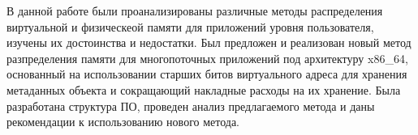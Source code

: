 \Conclusion %

В данной работе были проанализированы различные методы распределения виртуальной и физическеой памяти для приложений уровня пользователя, изучены их достоинства и недостатки. Был предложен и реализован новый метод разпределения памяти для многопоточных приложений под архитектуру x86\_64, основанный на использовании старших битов виртуального адреса для хранения метаданных объекта и сокращающий накладные расходы на их хранение. Была разработана структура ПО, проведен анализ предлагаемого метода и даны рекомендации к использованию нового метода.

